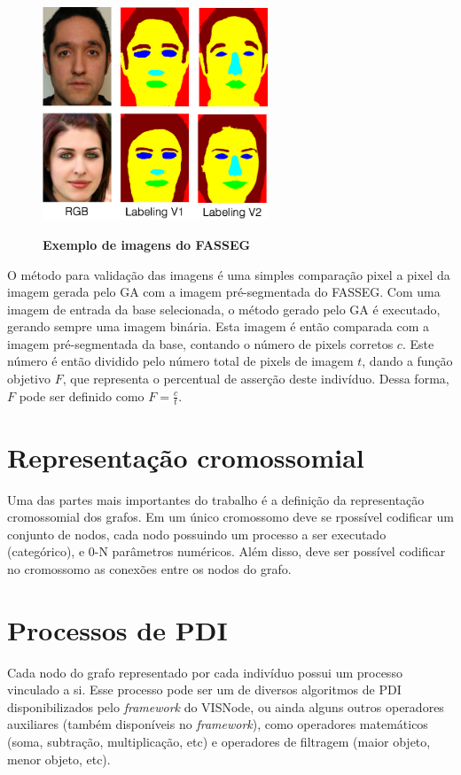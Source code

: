 \documentclass[12pt,oneside,a4paper,english,french,spanish,brazil,]{abntex2}
\begin{document}
\begin{figure}[ht]
\centering
\caption{\textbf{Exemplo de imagens do FASSEG}}
\includegraphics[width=0.6\textwidth]{imagens/FASSEG.png}
\label{fig:FASSEG}
\end{figure}

O método para validação das imagens é uma simples comparação pixel a pixel da imagem gerada pelo GA com a imagem pré-segmentada do FASSEG. Com uma imagem de entrada da base selecionada, o método gerado pelo GA é executado, gerando sempre uma imagem binária. Esta imagem é então comparada com a imagem pré-segmentada da base, contando o número de pixels corretos \(c\). Este número é então dividido pelo número total de pixels de imagem \(t\), dando a função objetivo \(F\), que representa o percentual de asserção deste indivíduo. Dessa forma, \(F\) pode ser definido como \(F = \frac{c}{t}\).

\section{Representação cromossomial}

Uma das partes mais importantes do trabalho é a definição da representação cromossomial dos grafos. Em um único cromossomo deve se rpossível codificar um conjunto de nodos, cada nodo possuindo um processo a ser executado (categórico), e 0-N parâmetros numéricos. Além disso, deve ser possível codificar no cromossomo as conexões entre os nodos do grafo.

\section{Processos de PDI}

Cada nodo do grafo representado por cada indivíduo possui um processo vinculado a si. Esse processo pode ser um de diversos algoritmos de PDI disponibilizados pelo \textit{framework} do VISNode, ou ainda alguns outros operadores auxiliares (também disponíveis no \textit{framework}), como operadores matemáticos (soma, subtração, multiplicação, etc) e operadores de filtragem (maior objeto, menor objeto, etc).
\end{document}
